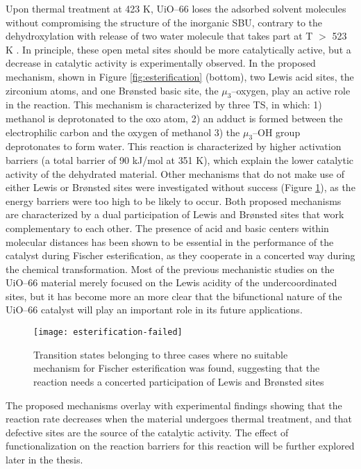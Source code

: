 Upon thermal treatment at 423 K, UiO--66 loses the adsorbed solvent molecules without compromising the structure of the inorganic SBU, contrary to the dehydroxylation with release of two water molecule that takes part at T $>$ 523 K \cite{shearer2013situ}. In principle, these open metal sites should be more catalytically active, but a decrease in catalytic activity is experimentally observed. In the proposed mechanism, shown in Figure \ref{fig:esterification} (bottom), two Lewis acid sites, the zirconium atoms, and one Br\o{}nsted basic site, the $\mu_3$--oxygen, play an active role in the reaction. This mechanism is characterized by three TS, in which: 1) methanol is deprotonated to the oxo atom, 2) an adduct is formed between the electrophilic carbon and the oxygen of methanol 3) the $\mu_3$--OH group deprotonates to form water. This reaction is characterized by higher activation barriers (a total barrier of 90 kJ/mol at 351 K), which explain the lower catalytic activity of the dehydrated material.
\npar
Other mechanisms that do not make use of either Lewis or Br\o{}nsted sites were investigated without success (Figure \ref{fig:esterification-failed}), as the energy barriers were too high to be likely to occur. Both proposed mechanisms are characterized by a dual participation of Lewis and Br\o{}nsted sites that work complementary to each other. The presence of acid and basic centers within molecular distances has been shown to be essential in the performance of the catalyst during Fischer esterification, as they cooperate in a concerted way during the chemical transformation. Most of the previous mechanistic studies on the UiO--66 material merely focused on the Lewis acidity of the undercoordinated sites, but it has become more an more clear that the bifunctional nature of the UiO--66 catalyst will play an important role in its future applications.
\begin{figure}[!htbp]
	\centering
	\texttt{[image: esterification-failed]}
	\caption{Transition states belonging to three cases where no suitable mechanism for Fischer esterification was found, suggesting that the reaction needs a concerted participation of Lewis and Br\o{}nsted sites}
	\label{fig:esterification-failed}
\end{figure}
\npar
The proposed mechanisms overlay with experimental findings showing that the reaction rate decreases when the material undergoes thermal treatment, and that defective sites are the source of the catalytic activity. The effect of functionalization on the reaction barriers for this reaction will be further explored later in the thesis.

